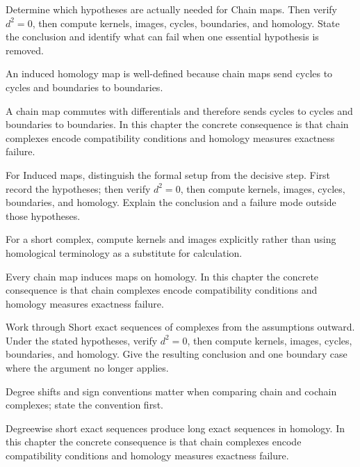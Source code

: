 \begin{exercise}\label{exr:v22-05}
Determine which hypotheses are actually needed for Chain maps. Then verify \(d^2=0\), then compute kernels, images, cycles, boundaries, and homology. State the conclusion and identify what can fail when one essential hypothesis is removed.
\end{exercise}
\begin{hint}
An induced homology map is well-defined because chain maps send cycles to cycles and boundaries to boundaries.
\end{hint}
\begin{solution}
A chain map commutes with differentials and therefore sends cycles to cycles and boundaries to boundaries. In this chapter the concrete consequence is that chain complexes encode compatibility conditions and homology measures exactness failure.
\end{solution}

\begin{exercise}\label{exr:v22-06}
For Induced maps, distinguish the formal setup from the decisive step. First record the hypotheses; then verify \(d^2=0\), then compute kernels, images, cycles, boundaries, and homology. Explain the conclusion and a failure mode outside those hypotheses.
\end{exercise}
\begin{hint}
For a short complex, compute kernels and images explicitly rather than using homological terminology as a substitute for calculation.
\end{hint}
\begin{solution}
Every chain map induces maps on homology. In this chapter the concrete consequence is that chain complexes encode compatibility conditions and homology measures exactness failure.
\end{solution}

\begin{exercise}\label{exr:v22-07}
Work through Short exact sequences of complexes from the assumptions outward. Under the stated hypotheses, verify \(d^2=0\), then compute kernels, images, cycles, boundaries, and homology. Give the resulting conclusion and one boundary case where the argument no longer applies.
\end{exercise}
\begin{hint}
Degree shifts and sign conventions matter when comparing chain and cochain complexes; state the convention first.
\end{hint}
\begin{solution}
Degreewise short exact sequences produce long exact sequences in homology. In this chapter the concrete consequence is that chain complexes encode compatibility conditions and homology measures exactness failure.
\end{solution}

